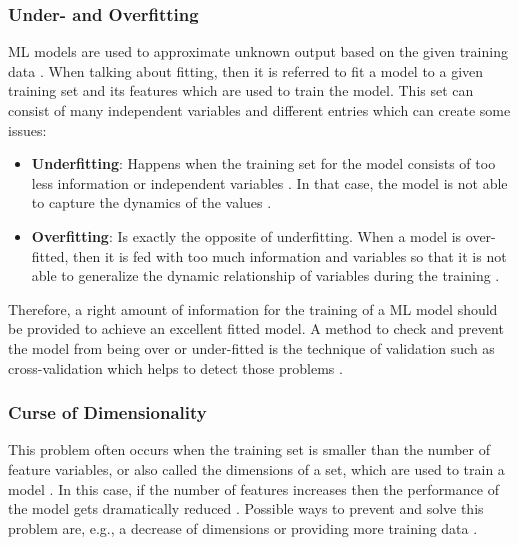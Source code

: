 \documentclass[MGS,Master,english]{twbook}%
\begin{document}
\subsubsection{Under- and Overfitting}
\ac{ML} models are used to approximate unknown output based on the given training data \cite{ml::book::algorithms}. When talking about fitting, then it is referred to fit a model to a given training set and its features which are used to train the model. This set can consist of many independent variables and different entries which can create some issues:
\begin{itemize}
	\item \textbf{Underfitting}: Happens when the training set for the model consists of too less information or independent variables \cite{ml::book::algorithms}. In that case, the model is not able to capture the dynamics of the values \cite{ml::book::algorithms}.
	\item \textbf{Overfitting}: Is exactly the opposite of underfitting. When a model is over-fitted, then it is fed with too much information and variables so that it is not able to generalize the dynamic relationship of variables during the training \cite{ml::book::algorithms}.
\end{itemize}

Therefore, a right amount of information for the training of a \ac{ML} model should be provided to achieve an excellent fitted model. A method to check and prevent the model from being over or under-fitted is the technique of validation such as cross-validation which helps to detect those problems \cite{ml::book::algorithms}.

\subsubsection{Curse of Dimensionality}
This problem often occurs when the training set is smaller than the number of feature variables, or also called the dimensions of a set, which are used to train a model \cite{ml::book::algorithms}. In this case, if the number of features increases then the performance of the model gets dramatically reduced \cite{ml::book::algorithms}. Possible ways to prevent and solve this problem are, e.g., a decrease of dimensions or providing more training data \cite{ml::book::algorithms}.
\end{document}
